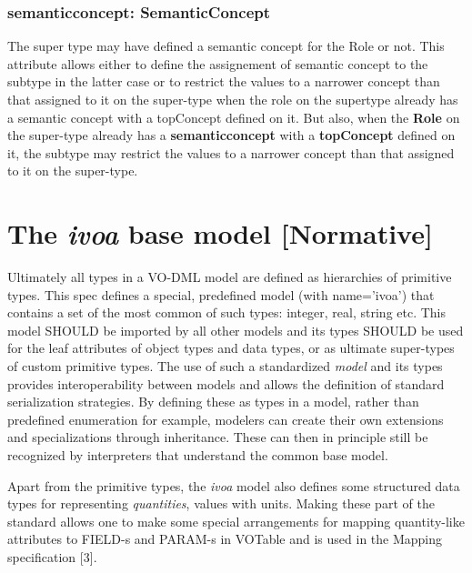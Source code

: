 \documentclass[10pt,a4paper]{ivoa}
\begin{document}
\hypertarget{semanticconcept-semanticconcept}{%
\subsubsection{semanticconcept:
SemanticConcept}\label{semanticconcept-semanticconcept}}

The super type may have defined a semantic concept for the Role or not.
This attribute allows either to define the assignement of semantic
concept to the subtype in the latter case or to restrict the values to a
narrower concept than that assigned to it on the super-type when the
role on the supertype already has a semantic concept with a topConcept
defined on it. But also, when the \textbf{Role} on the super-type
already has a \textbf{semanticconcept} with a \textbf{topConcept}
defined on it, the subtype may restrict the values to a narrower concept
than that assigned to it on the super-type.

\hypertarget{the-ivoa-base-model-normative}{%
\section{\texorpdfstring{The \emph{ivoa} base model
{[}Normative{]}}{The ivoa base model {[}Normative{]}}}\label{the-ivoa-base-model-normative}}

Ultimately all types in a VO-DML model are defined as hierarchies of
primitive types. This spec defines a special, predefined model (with
name='ivoa') that contains a set of the most common of such types:
integer, real, string etc. This model SHOULD be imported by all other
models and its types SHOULD be used for the leaf attributes of object
types and data types, or as ultimate super-types of custom primitive
types. The use of such a standardized \emph{model} and its types
provides interoperability between models and allows the definition of
standard serialization strategies. By defining these as types in a
model, rather than predefined enumeration for example, modelers can
create their own extensions and specializations through inheritance.
These can then in principle still be recognized by interpreters that
understand the common base model.

Apart from the primitive types, the \emph{ivoa} model also defines some
structured data types for representing \emph{quantities}, values with
units. Making these part of the standard allows one to make some special
arrangements for mapping quantity-like attributes to FIELD-s and PARAM-s
in VOTable and is used in the Mapping specification {[}3{]}.
\end{document}
